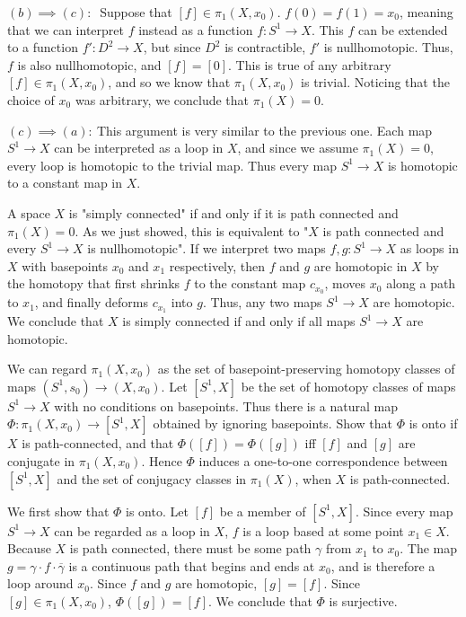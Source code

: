 \begin{homework}[e]
\begin{prf}
		  $(b) \implies (c):~$ Suppose that $[f] \in \pi_1(X,x_0)$. $f(0) = f(1) = x_0$, meaning that we can interpret $f$ instead as a function $f:S^1 \rightarrow X$. This $f$ can be extended to a function $f': D^2 \rightarrow X$, but since $D^2$ is contractible, $f'$ is nullhomotopic. Thus, $f$ is also nullhomotopic, and $[f] = [0]$. This is true of any arbitrary $[f] \in \pi_1(X,x_0)$, and so we know that $\pi_1(X,x_0)$ is trivial. Noticing that the choice of $x_0$ was arbitrary, we conclude that $\pi_1(X) = 0$.
		  
		  $(c) \implies (a):~$This argument is very similar to the previous one. Each map $S^1 \rightarrow X$ can be interpreted as a loop in $X$, and since we assume $\pi_1(X) = 0$, every loop is homotopic to the trivial map. Thus every map $S^1 \rightarrow X$ is homotopic to a constant map in $X$.
		  
		  \bigskip
		  
		  A space $X$ is "simply connected" if and only if it is path connected and $\pi_1(X) = 0$. As we just showed, this is equivalent to "$X$ is path connected and every $S^1 \rightarrow X$ is nullhomotopic". If we interpret two maps $f,g:S^1 \rightarrow X$ as loops in $X$ with basepoints $x_0$ and $x_1$ respectively, then $f$ and $g$ are homotopic in $X$ by the homotopy that first shrinks $f$ to the constant map $c_{x_0}$, moves $x_0$ along a path to $x_1$, and finally deforms $c_{x_1}$ into $g$. Thus, any two maps $S^1 \rightarrow X$ are homotopic. We conclude that $X$ is simply connected if and only if all maps $S^1 \rightarrow X$ are homotopic.
    \end{prf}

 We can regard $\pi_1 (X,x_0)$ as the set of basepoint-preserving homotopy classes of maps $(S^1,s_0) \rightarrow (X,x_0)$. Let $[S^1,X]$ be the set of homotopy classes of maps $S^1 \rightarrow X$ with no conditions on basepoints. Thus there is a natural map $\Phi: \pi_1(X,x_0) \rightarrow [S^1,X]$ obtained by ignoring basepoints. Show that $\Phi$ is onto if $X$ is path-connected, and that $\Phi([f]) = \Phi([g])$ iff $[f]$ and $[g]$ are conjugate in $\pi_1(X,x_0)$. Hence $\Phi$ induces a one-to-one correspondence between $[S^1,X]$ and the set of conjugacy classes in $\pi_1(X)$, when $X$ is path-connected. 

\begin{prf}
We first show that $\Phi$ is onto. Let $[f]$ be a member of $[S^1, X]$. Since every map $S^1 \rightarrow X$ can be regarded as a loop in $X$, $f$ is a loop based at some point $x_1 \in X$. Because $X$ is path connected, there must be some path $\gamma$ from $x_1$ to $x_0$. The map $g = \gamma \cdot f \cdot \overline{\gamma}$ is a continuous path that begins and ends at $x_0$, and is therefore a loop around $x_0$. Since $f$ and $g$ are homotopic, $[g] = [f]$. Since $[g] \in \pi_1(X,x_0)$, $\Phi([g]) = [f]$. We conclude that $\Phi$ is surjective. 


\end{prf}
\end{homework}
